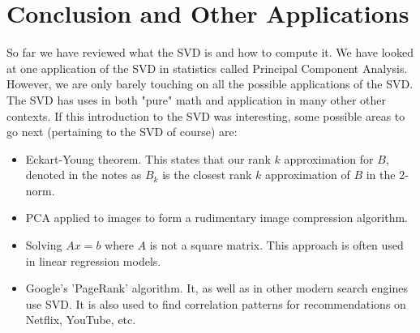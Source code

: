 \documentclass{article}
\begin{document}
\newpage
\section{Conclusion and Other Applications}
So far we have reviewed what the SVD is and how to compute it. We have looked at one application of the SVD in statistics called Principal Component Analysis. However, we are only barely touching on all the possible applications of the SVD. The SVD has uses in both "pure" math and application in many other other contexts. If  this introduction to the SVD was interesting, some possible areas to go next (pertaining to the SVD of course) are:
\begin{itemize}
  \item Eckart-Young theorem. This states that our rank $k$ approximation for $B$, denoted in the notes as $B_k$ is the closest rank $k$ approximation of $B$ in the 2-norm.
  \item PCA applied to images to form a rudimentary image compression algorithm.
  \item Solving $Ax = b$ where $A$ is not a square matrix. This approach is often used in linear regression models.
  \item Google's 'PageRank' algorithm. It, as well as in other modern search engines use SVD. It is also used to find correlation patterns for recommendations on Netflix, YouTube, etc.
\end{itemize}
\end{document}
